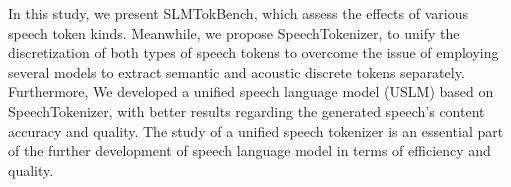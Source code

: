 In this study, we present SLMTokBench, which assess the effects of various speech token kinds. Meanwhile, we propose SpeechTokenizer, to unify the discretization of both types of speech tokens to overcome the issue of employing several models to extract semantic and acoustic discrete tokens separately. Furthermore, We developed a unified speech language model (USLM) based on SpeechTokenizer, with better results regarding the generated speech's content accuracy and quality.
The study of a unified speech tokenizer is an essential part of the further development of speech language model in terms of efficiency and quality. 

